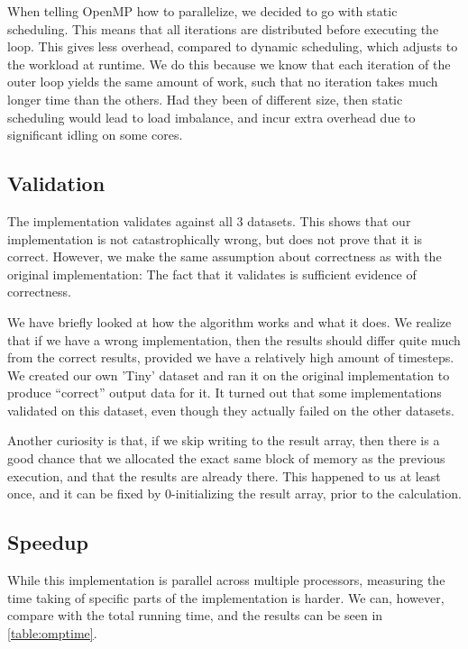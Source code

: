 \documentclass[11pt]{article}
\begin{document}
When telling OpenMP how to parallelize, we decided to go with static scheduling.
This means that all iterations are distributed before executing the loop. This gives
less overhead, compared to dynamic scheduling, which adjusts to the workload at runtime. We do
this because we know that each iteration of the outer loop yields the same
amount of work, such that no iteration takes much longer time than the others.
Had they been of different size, then static scheduling would lead to load 
imbalance, and incur extra overhead due to significant idling on some cores.


\subsection{Validation}
The implementation validates against all 3 datasets. This shows that our
implementation is not catastrophically wrong, but does not prove that it is
correct. However, we make the same assumption about correctness as with the 
original implementation: The fact that it validates is sufficient evidence of correctness.

We have briefly looked at how the algorithm works and what it does. We
realize that if we have a wrong implementation, then the results should differ quite much from the correct results, provided we have a relatively high amount of timesteps. We created our own 'Tiny' dataset and ran it on the original implementation to produce ``correct'' output data for it. It turned out that some implementations validated on this dataset, even though they actually failed on the other datasets.

Another curiosity is that, if we skip writing to the result array, then there
is a good chance that we allocated the exact same block of memory as the 
previous execution, and that the results are already there. This happened to us
at least once, and it can be fixed by 0-initializing the result array, prior to
the calculation.


\subsection{Speedup}
While this implementation is parallel across multiple processors, measuring the
time taking of specific parts of the implementation is harder. We can, however, 
compare with the total running time, and the results can be seen in 
\autoref{table:omptime}.
\end{document}
